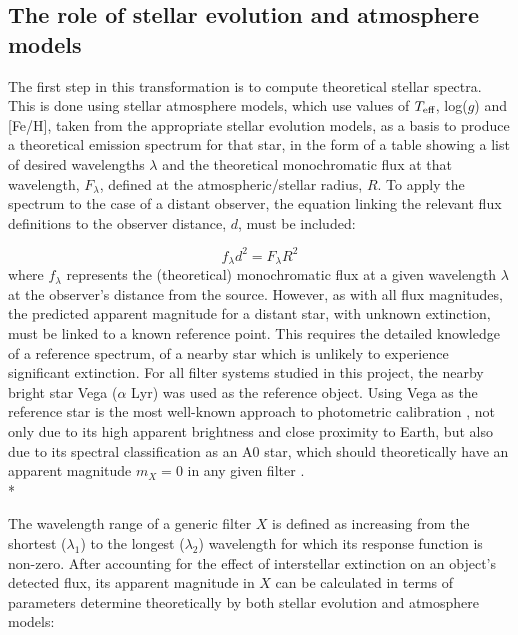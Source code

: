 \documentclass[12pt, a4paper]{report}
\begin{document}
\subsection{The role of stellar evolution and atmosphere models}
The first step in this transformation is to compute theoretical stellar spectra. This is done using stellar atmosphere models, which use values of $T_{\textnormal{eff}}$, log($g$) and [Fe/H], taken from the appropriate stellar evolution models, as a basis to produce a theoretical emission spectrum for that star, in the form of a table showing a list of desired wavelengths $\lambda$ and the theoretical monochromatic flux at that wavelength, $F_{\lambda}$, defined at the atmospheric/stellar radius, $R$. To apply the spectrum to the case of a distant observer, the equation linking the relevant flux definitions to the observer distance, $d$, must be included:

\begin{equation}
f_{\lambda}d^{2}=F_{\lambda}R^{2}
\label{flux_dist_rd}
\end{equation}
where $f_{\lambda}$ represents the (theoretical) monochromatic flux at a given wavelength $\lambda$ at the observer's distance from the source. However, as with all flux magnitudes, the predicted apparent magnitude for a distant star, with unknown extinction, must be linked to a known reference point. This requires the detailed knowledge of a reference spectrum, of a nearby star which is unlikely to experience significant extinction. For all filter systems studied in this project, the nearby bright star Vega ($\alpha$ Lyr) was used as the reference object. Using Vega as the reference star is the most well-known approach to photometric calibration \citep{2014MNRAS.444..392C}, not only due to its high apparent brightness and close proximity to Earth, but also due to its spectral classification as an A0 star, which should theoretically have an apparent magnitude $m_{X} = 0$ in any given filter \citep{1953ApJ...117..313J}.\\*

The wavelength range of a generic filter $X$ is defined as increasing from the shortest ($\lambda_{1}$) to the longest ($\lambda_{2}$) wavelength for which its response function is non-zero. After accounting for the effect of interstellar extinction on an object's detected flux, its apparent magnitude in $X$ can be calculated in terms of parameters determine theoretically by both stellar evolution and atmosphere models:
\end{document}
